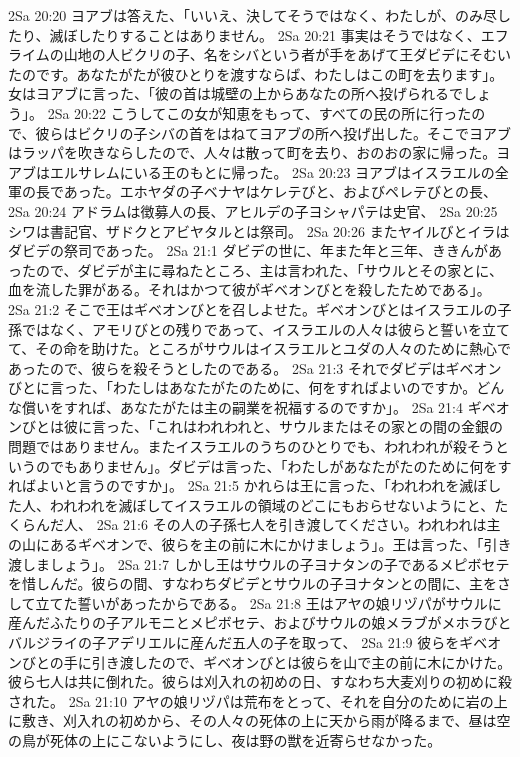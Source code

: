 2Sa 20:20  ヨアブは答えた、「いいえ、決してそうではなく、わたしが、のみ尽したり、滅ぼしたりすることはありません。
2Sa 20:21  事実はそうではなく、エフライムの山地の人ビクリの子、名をシバという者が手をあげて王ダビデにそむいたのです。あなたがたが彼ひとりを渡すならば、わたしはこの町を去ります」。女はヨアブに言った、「彼の首は城壁の上からあなたの所へ投げられるでしょう」。
2Sa 20:22  こうしてこの女が知恵をもって、すべての民の所に行ったので、彼らはビクリの子シバの首をはねてヨアブの所へ投げ出した。そこでヨアブはラッパを吹きならしたので、人々は散って町を去り、おのおの家に帰った。ヨアブはエルサレムにいる王のもとに帰った。
2Sa 20:23  ヨアブはイスラエルの全軍の長であった。エホヤダの子ベナヤはケレテびと、およびペレテびとの長、
2Sa 20:24  アドラムは徴募人の長、アヒルデの子ヨシャパテは史官、
2Sa 20:25  シワは書記官、ザドクとアビヤタルとは祭司。
2Sa 20:26  またヤイルびとイラはダビデの祭司であった。
2Sa 21:1  ダビデの世に、年また年と三年、ききんがあったので、ダビデが主に尋ねたところ、主は言われた、「サウルとその家とに、血を流した罪がある。それはかつて彼がギベオンびとを殺したためである」。
2Sa 21:2  そこで王はギベオンびとを召しよせた。ギベオンびとはイスラエルの子孫ではなく、アモリびとの残りであって、イスラエルの人々は彼らと誓いを立てて、その命を助けた。ところがサウルはイスラエルとユダの人々のために熱心であったので、彼らを殺そうとしたのである。
2Sa 21:3  それでダビデはギベオンびとに言った、「わたしはあなたがたのために、何をすればよいのですか。どんな償いをすれば、あなたがたは主の嗣業を祝福するのですか」。
2Sa 21:4  ギベオンびとは彼に言った、「これはわれわれと、サウルまたはその家との間の金銀の問題ではありません。またイスラエルのうちのひとりでも、われわれが殺そうというのでもありません」。ダビデは言った、「わたしがあなたがたのために何をすればよいと言うのですか」。
2Sa 21:5  かれらは王に言った、「われわれを滅ぼした人、われわれを滅ぼしてイスラエルの領域のどこにもおらせないようにと、たくらんだ人、
2Sa 21:6  その人の子孫七人を引き渡してください。われわれは主の山にあるギベオンで、彼らを主の前に木にかけましょう」。王は言った、「引き渡しましょう」。
2Sa 21:7  しかし王はサウルの子ヨナタンの子であるメピボセテを惜しんだ。彼らの間、すなわちダビデとサウルの子ヨナタンとの間に、主をさして立てた誓いがあったからである。
2Sa 21:8  王はアヤの娘リヅパがサウルに産んだふたりの子アルモニとメピボセテ、およびサウルの娘メラブがメホラびとバルジライの子アデリエルに産んだ五人の子を取って、
2Sa 21:9  彼らをギベオンびとの手に引き渡したので、ギベオンびとは彼らを山で主の前に木にかけた。彼ら七人は共に倒れた。彼らは刈入れの初めの日、すなわち大麦刈りの初めに殺された。
2Sa 21:10  アヤの娘リヅパは荒布をとって、それを自分のために岩の上に敷き、刈入れの初めから、その人々の死体の上に天から雨が降るまで、昼は空の鳥が死体の上にこないようにし、夜は野の獣を近寄らせなかった。
